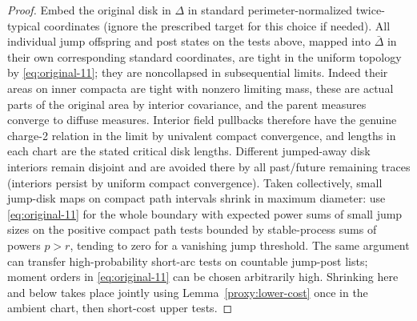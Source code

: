 \begin{proof}

Embed the original disk in \(\Delta\) in standard perimeter-normalized twice-typical coordinates (ignore the prescribed target for this choice if needed).
All individual jump offspring and post states on the tests above, mapped into \(\bar\Delta\) in their own corresponding standard coordinates, are tight in the uniform topology by \eqref{eq:original-11}; they are noncollapsed in subsequential limits.
Indeed their areas on inner compacta are tight with nonzero limiting mass, these are actual parts of the original area by interior covariance, and the parent measures converge to diffuse measures.
Interior field pullbacks therefore have the genuine charge-2 relation in the limit by univalent compact convergence, and lengths in each chart are the stated critical disk lengths.
Different jumped-away disk interiors remain disjoint and are avoided there by all past/future remaining traces (interiors persist by uniform compact convergence).
Taken collectively, small jump-disk maps on compact path intervals shrink in maximum diameter: use \eqref{eq:original-11} for the whole boundary with expected power sums of small jump sizes on the positive compact path tests bounded by stable-process sums of powers \(p>r\), tending to zero for a vanishing jump threshold.
The same argument can transfer high-probability short-arc tests on countable jump-post lists; moment orders in \eqref{eq:original-11} can be chosen arbitrarily high.
Shrinking here and below takes place jointly using Lemma~\ref{proxy:lower-cost} once in the ambient chart, then short-cost upper tests.



\end{proof}
